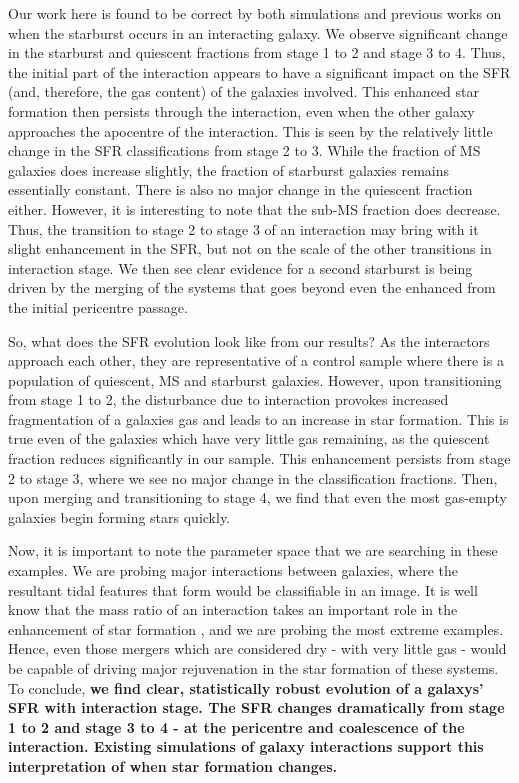 \documentclass[fleqn,usenatbib]{mnras}
\begin{document}
Our work here is found to be correct by both simulations and previous works on when the starburst occurs in an interacting galaxy. We observe significant change in the starburst and quiescent fractions from stage 1 to 2 and stage 3 to 4. Thus, the initial part of the interaction appears to have a significant impact on the SFR (and, therefore, the gas content) of the galaxies involved. This enhanced star formation then persists through the interaction, even when the other galaxy approaches the apocentre of the interaction. This is seen by the relatively little change in the SFR classifications from stage 2 to 3. While the fraction of MS galaxies does increase slightly, the fraction of starburst galaxies remains essentially constant. There is also no major change in the quiescent fraction either. However, it is interesting to note that the sub-MS fraction does decrease. Thus, the transition to stage 2 to stage 3 of an interaction may bring with it slight enhancement in the SFR, but not on the scale of the other transitions in interaction stage. We then see clear evidence for a second starburst is being driven by the merging of the systems that goes beyond even the enhanced from the initial pericentre passage. 

So, what does the SFR evolution look like from our results? As the interactors approach each other, they are representative of a control sample where there is a population of quiescent, MS and starburst galaxies. However, upon transitioning from stage 1 to 2, the disturbance due to interaction provokes increased fragmentation of a galaxies gas and leads to an increase in star formation. This is true even of the galaxies which have very little gas remaining, as the quiescent fraction reduces significantly in our sample. This enhancement persists from stage 2 to stage 3, where we see no major change in the classification fractions. Then, upon merging and transitioning to stage 4, we find that even the most gas-empty galaxies begin forming stars quickly. 

Now, it is important to note the parameter space that we are searching in these examples. We are probing major interactions between galaxies, where the resultant tidal features that form would be classifiable in an image. It is well know that the mass ratio of an interaction takes an important role in the enhancement of star formation \citep{papers about major interaction}, and we are probing the most extreme examples. Hence, even those mergers which are considered dry - with very little gas - would be capable of driving major rejuvenation in the star formation of these systems. To conclude, \textbf{we find clear, statistically robust evolution of a galaxys' SFR with interaction stage. The SFR changes dramatically from stage 1 to 2 and stage 3 to 4 - at the pericentre and coalescence of the interaction. Existing simulations of galaxy interactions support this interpretation of when star formation changes.}
\end{document}
